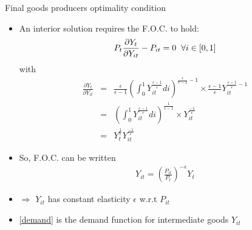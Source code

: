 \documentclass[9pt,xcolor={dvipsnames}]{beamer}
\newcommand{\bit}{\begin{itemize}}
\newcommand{\eit}{\end{itemize}}
\begin{document}
\begin{frame}{Final goods producers optimality condition}

\bit
\setlength\itemsep{1em}

\item An interior solution requires the F.O.C. to hold:
\begin{eqnarray}
P_t \frac{\partial Y_t}{\partial Y_{it}} - P_{it} = 0 \hspace{2mm} \forall i \in [0,1]\nonumber
\end{eqnarray}
with  
\begin{eqnarray}
\frac{\partial Y_t}{\partial Y_{it}} &=& \frac{\epsilon}{\epsilon-1} \left(\int_{0}^{1} Y_{it}^{\frac{\epsilon-1}{\epsilon}} di \right)^{\frac{\epsilon}{\epsilon-1}-1} \times \frac{\epsilon-1}{\epsilon} Y_{it}^{\frac{\epsilon-1}{\epsilon} - 1} \nonumber \\
&=& \left(\int_{0}^{1} Y_{it}^{\frac{\epsilon-1}{\epsilon}} di \right)^{\frac{1}{\epsilon-1}} \times  Y_{it}^{\frac{-1}{\epsilon}} \nonumber \\
&=& Y_t^{\frac{1}{\epsilon}}  Y_{it}^{\frac{-1}{\epsilon}} \nonumber
\end{eqnarray}

\item So, F.O.C. can be written
\begin{eqnarray}
\label{demand}
Y_{it} = \left(\frac{P_{it}}{P_t}\right)^{-\epsilon} Y_t
\end{eqnarray}

\item $\Rightarrow$ $Y_{it}$ has constant elasticity $\epsilon$ w.r.t $P_{it}$

\item \eqref{demand} is the demand function for intermediate goods $Y_{it}$

\eit

\end{frame}


%
%
%
\end{document}
